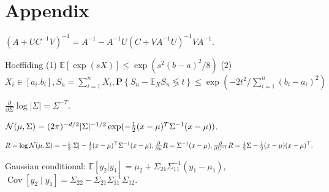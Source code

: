 \section{Appendix}
\begin{footnotesize}
    
    
    
$(A + U C^{-1} V)^{-1} = A^{-1} - A^{-1}U(C+VA^{-1}U)^{-1}V A^{-1}$.


Hoeffiding (1) $\mathbb{E}[\exp (s X)] \leq \exp \left(s^{2}(b-a)^{2} / 8\right)$ (2) $X_i \in [a_i. b_i], S_{n}=\sum_{i=1}^{n} X_{i},\mathbf{P}\left\{S_{n}-\mathbb{E}_{X} S_{n} \lessgtr  t\right\} \leq \exp \left(-{2 t^{2}} / {\sum_{i=1}^{n}\left(b_{i}-a_{i}\right)^{2}}\right)$
\end{footnotesize}

$\frac{\partial}{\partial \Sigma} \log|\Sigma| = \Sigma^{-T}$.




$\mathcal{N}(\mu,\Sigma)=(2\pi)^{-d/2}|\Sigma|^{-1/2}\exp(-\frac{1}{2}(x-\mu)^T \Sigma^{-1} (x-\mu))$.

$R = \log \mathcal{N}(\mu, \Sigma) = -\frac{1}{2}|\Sigma| - \frac{1}{2}(x - \mu)^\top \Sigma^{-1} (x - \mu), \frac{\partial}{\partial \mu} R = \Sigma^{-1} (x - \mu), \frac{\partial}{\partial \Sigma^{-1}} R = \frac{1}{2} \Sigma - \frac{1}{2}(x - \mu)(x - \mu)^\top.$

Gaussian conditional: $\mathbb{E} [y_2 | y_1] = \mu_2+\Sigma_{21}\Sigma_{11}^{-1} (y_1-\mu_1)$, $\operatorname{Cov}[y_2\mid y_1] = \Sigma_{22} - \Sigma_{21}\Sigma_{11}^{-1}\Sigma_{12}$.